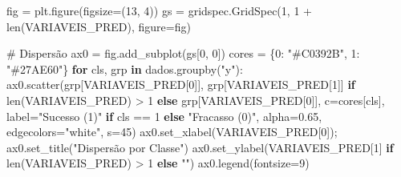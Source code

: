 \documentclass[
  letterpaper,
  DIV=11,
  numbers=noendperiod]{scrartcl}
\newenvironment{Shaded}{\begin{snugshade}}{\end{snugshade}}
\newcommand{\BuiltInTok}[1]{\textcolor[rgb]{0.00,0.23,0.31}{#1}}
\newcommand{\CommentTok}[1]{\textcolor[rgb]{0.37,0.37,0.37}{#1}}
\newcommand{\ControlFlowTok}[1]{\textcolor[rgb]{0.00,0.23,0.31}{\textbf{#1}}}
\newcommand{\DecValTok}[1]{\textcolor[rgb]{0.68,0.00,0.00}{#1}}
\newcommand{\FloatTok}[1]{\textcolor[rgb]{0.68,0.00,0.00}{#1}}
\newcommand{\KeywordTok}[1]{\textcolor[rgb]{0.00,0.23,0.31}{\textbf{#1}}}
\newcommand{\NormalTok}[1]{\textcolor[rgb]{0.00,0.23,0.31}{#1}}
\newcommand{\OperatorTok}[1]{\textcolor[rgb]{0.37,0.37,0.37}{#1}}
\newcommand{\StringTok}[1]{\textcolor[rgb]{0.13,0.47,0.30}{#1}}
\begin{document}
\begin{Shaded}
\begin{Highlighting}[]
\NormalTok{fig }\OperatorTok{=}\NormalTok{ plt.figure(figsize}\OperatorTok{=}\NormalTok{(}\DecValTok{13}\NormalTok{, }\DecValTok{4}\NormalTok{))}
\NormalTok{gs  }\OperatorTok{=}\NormalTok{ gridspec.GridSpec(}\DecValTok{1}\NormalTok{, }\DecValTok{1} \OperatorTok{+} \BuiltInTok{len}\NormalTok{(VARIAVEIS\_PRED), figure}\OperatorTok{=}\NormalTok{fig)}

\CommentTok{\# Dispersão}
\NormalTok{ax0   }\OperatorTok{=}\NormalTok{ fig.add\_subplot(gs[}\DecValTok{0}\NormalTok{, }\DecValTok{0}\NormalTok{])}
\NormalTok{cores }\OperatorTok{=}\NormalTok{ \{}\DecValTok{0}\NormalTok{: }\StringTok{"\#C0392B"}\NormalTok{, }\DecValTok{1}\NormalTok{: }\StringTok{"\#27AE60"}\NormalTok{\}}
\ControlFlowTok{for}\NormalTok{ cls, grp }\KeywordTok{in}\NormalTok{ dados.groupby(}\StringTok{"y"}\NormalTok{):}
\NormalTok{    ax0.scatter(grp[VARIAVEIS\_PRED[}\DecValTok{0}\NormalTok{]],}
\NormalTok{                grp[VARIAVEIS\_PRED[}\DecValTok{1}\NormalTok{]] }\ControlFlowTok{if} \BuiltInTok{len}\NormalTok{(VARIAVEIS\_PRED) }\OperatorTok{\textgreater{}} \DecValTok{1} \ControlFlowTok{else}\NormalTok{ grp[VARIAVEIS\_PRED[}\DecValTok{0}\NormalTok{]],}
\NormalTok{                c}\OperatorTok{=}\NormalTok{cores[cls],}
\NormalTok{                label}\OperatorTok{=}\StringTok{"Sucesso (1)"} \ControlFlowTok{if}\NormalTok{ cls }\OperatorTok{==} \DecValTok{1} \ControlFlowTok{else} \StringTok{"Fracasso (0)"}\NormalTok{,}
\NormalTok{                alpha}\OperatorTok{=}\FloatTok{0.65}\NormalTok{, edgecolors}\OperatorTok{=}\StringTok{"white"}\NormalTok{, s}\OperatorTok{=}\DecValTok{45}\NormalTok{)}
\NormalTok{ax0.set\_xlabel(VARIAVEIS\_PRED[}\DecValTok{0}\NormalTok{])}\OperatorTok{;}\NormalTok{ ax0.set\_title(}\StringTok{"Dispersão por Classe"}\NormalTok{)}
\NormalTok{ax0.set\_ylabel(VARIAVEIS\_PRED[}\DecValTok{1}\NormalTok{] }\ControlFlowTok{if} \BuiltInTok{len}\NormalTok{(VARIAVEIS\_PRED) }\OperatorTok{\textgreater{}} \DecValTok{1} \ControlFlowTok{else} \StringTok{""}\NormalTok{)}
\NormalTok{ax0.legend(fontsize}\OperatorTok{=}\DecValTok{9}\NormalTok{)}


\end{Highlighting}
\end{Shaded}
\end{document}
